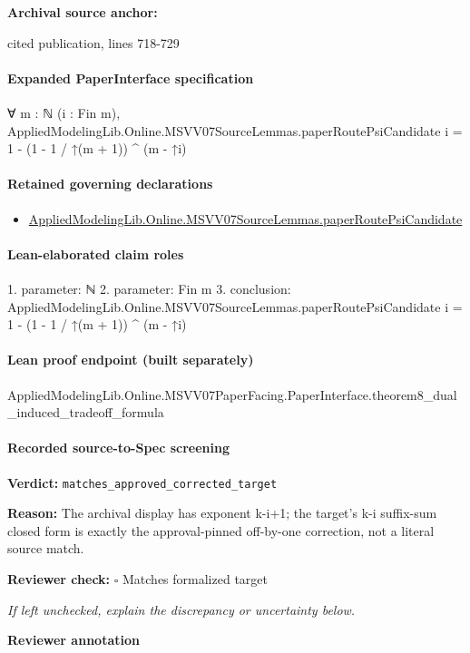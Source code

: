 \documentclass[10pt]{article}
\newcommand{\reviewerbox}{%
  \par\noindent\fbox{\parbox{0.96\linewidth}{\rule{0pt}{0.38in}}}\par
}
\newcommand{\reviewmatch}[1]{%
  \par\noindent\textbf{Reviewer check:} $\square$\; #1\par
  \noindent\emph{If left unchecked, explain the discrepancy or uncertainty below.}\par
}
\begin{document}
\textbf{Archival source anchor:} {\footnotesize\raggedright cited publication, lines 718-\allowbreak{}729\par}
\paragraph{Expanded PaperInterface specification}
\begin{ReviewVerbatim}
∀ {m : ℕ} (i : Fin m),
  AppliedModelingLib.Online.MSVV07SourceLemmas.paperRoutePsiCandidate i = 1 - (1 - 1 / ↑(m + 1)) ^ (m - ↑i)
\end{ReviewVerbatim}

\paragraph{Retained governing declarations}
\begin{itemize}\raggedright
\item \hyperlink{governing-declaration-05c17985c30d0eaf}{Applied\allowbreak{}Modeling\allowbreak{}Lib.\allowbreak{}Online.\allowbreak{}MSVV07\allowbreak{}Source\allowbreak{}Lemmas.\allowbreak{}paper\allowbreak{}Route\allowbreak{}Psi\allowbreak{}Candidate}
\end{itemize}
\paragraph{Lean-elaborated claim roles}\begin{ReviewVerbatim}
1. parameter: ℕ
2. parameter: Fin m
3. conclusion: AppliedModelingLib.Online.MSVV07SourceLemmas.paperRoutePsiCandidate i = 1 - (1 - 1 / ↑(m + 1)) ^ (m - ↑i)
\end{ReviewVerbatim}

\paragraph{Lean proof endpoint (built separately)}\begin{ReviewVerbatim}
AppliedModelingLib.Online.MSVV07PaperFacing.PaperInterface.theorem8_dual_induced_tradeoff_formula
\end{ReviewVerbatim}

\paragraph{Recorded source-to-Spec screening}
\textbf{Verdict:} \texttt{matches\_approved\_corrected\_target}
\\
{\raggedright
\textbf{Reason:} The archival display has exponent k-\allowbreak{}i+1;\allowbreak{} the target's k-\allowbreak{}i suffix-\allowbreak{}sum closed form is exactly the approval-\allowbreak{}pinned off-\allowbreak{}by-\allowbreak{}one correction, not a literal source match.\allowbreak{}
\par}
\reviewmatch{Matches formalized target}
\noindent\textbf{Reviewer annotation}\par
\reviewerbox
\clearpage
\hypertarget{source-claim-8da75fcd3b4daadd}{}
\end{document}
